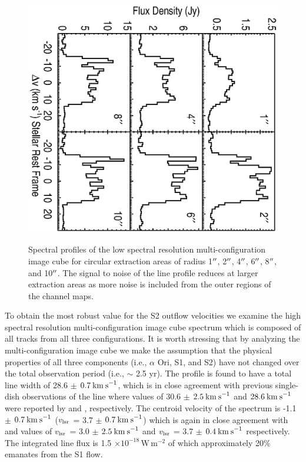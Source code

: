 \documentclass[iop]{emulateapj}
\begin{document}
\begin{figure}
\includegraphics[scale=0.75, angle=90, width=13.0cm, height=11cm, trim=20pt 50pt 20pt 40pt]{f2.eps}
\caption{Spectral profiles of the low spectral resolution multi-configuration image cube for circular extraction areas of radius 1$\mbox{$^{\prime\prime}$}$, 2$\mbox{$^{\prime\prime}$}$, 4$\mbox{$^{\prime\prime}$}$, 6$\mbox{$^{\prime\prime}$}$, 8$\mbox{$^{\prime\prime}$}$, and 10$\mbox{$^{\prime\prime}$}$. The signal to noise of the line profile reduces at larger extraction areas as more noise is included from the outer regions of the channel maps.}
\label{fig:fig2}
\end{figure}

To obtain the most robust value for the S2 outflow velocities we examine the high spectral resolution multi-configuration image cube spectrum which is composed of all tracks from all three configurations. It is worth stressing that by analyzing the multi-configuration image cube we make the assumption that the physical properties of all three components (i.e., $\alpha$ Ori, S1, and S2) have not changed over the total observation period (i.e., $\sim$ 2.5 yr). The profile is found to have a total line width of 28.6 $\pm$ $0.7\>{\rm km\>s}^{-1}$, which is in close agreement with previous single-dish observations of the line where values of 30.6 $\pm$ $2.5\>{\rm km\>s}^{-1}$ and $28.6\>{\rm km\>s}^{-1}$ were reported by \cite{1980ApJ...242L..25K} and \cite{1987ApJ...313..400H}, respectively. The centroid velocity of the spectrum is  -1.1 $\pm$ $0.7\>{\rm km\>s}^{-1}$ ($v_{\rm{lsr}}$ = 3.7 $\pm$ $0.7\>{\rm km\>s}^{-1}$) which is again in close agreement with \cite{1980ApJ...242L..25K} and \cite{1987ApJ...313..400H} values of $v_{\rm{lsr}}$ = 3.0 $\pm$ $2.5\>{\rm km\>s}^{-1}$ and $v_{\rm{lsr}}$ = 3.7 $\pm$ $0.4\>{\rm km\>s}^{-1}$ respectively. The integrated line flux is 1.5 $\times 10^{-18}$\,W\,m$^{-2}$ of which approximately 20\% emanates from the S1 flow.
\end{document}
